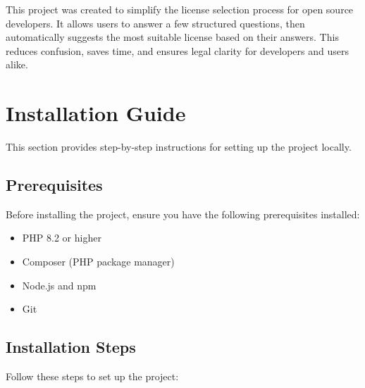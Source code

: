 \documentclass[12pt,a4paper]{report}
\begin{document}
This project was created to simplify the license selection process for open source developers. It allows users to answer a few structured questions, then automatically suggests the most suitable license based on their answers. This reduces confusion, saves time, and ensures legal clarity for developers and users alike.

\chapter{Installation Guide}
This section provides step-by-step instructions for setting up the project locally.

\section{Prerequisites}
Before installing the project, ensure you have the following prerequisites installed:
\begin{itemize}
    \item PHP 8.2 or higher
    \item Composer (PHP package manager)
    \item Node.js and npm
    \item Git
\end{itemize}

\section{Installation Steps}
Follow these steps to set up the project:
\end{document}
